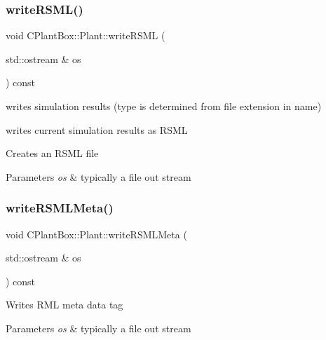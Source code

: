 \subsubsection{\texorpdfstring{write\+R\+S\+M\+L()}{writeRSML()}}
{\footnotesize\ttfamily void C\+Plant\+Box\+::\+Plant\+::write\+R\+S\+ML (\begin{DoxyParamCaption}\item[{std\+::ostream \&}]{os }\end{DoxyParamCaption}) const}



writes simulation results (type is determined from file extension in name) 

writes current simulation results as R\+S\+ML

Creates an R\+S\+ML file


\begin{DoxyParams}{Parameters}
{\em os} & typically a file out stream \\
\hline
\end{DoxyParams}
\mbox{\label{classCPlantBox_1_1Plant_a3ccfdf7f0fb24b6b8bf21e39e6fbfbfc}} 
\subsubsection{\texorpdfstring{write\+R\+S\+M\+L\+Meta()}{writeRSMLMeta()}}
{\footnotesize\ttfamily void C\+Plant\+Box\+::\+Plant\+::write\+R\+S\+M\+L\+Meta (\begin{DoxyParamCaption}\item[{std\+::ostream \&}]{os }\end{DoxyParamCaption}) const\hspace{0.3cm}{\ttfamily [protected]}}

Writes R\+ML meta data tag


\begin{DoxyParams}{Parameters}
{\em os} & typically a file out stream \\
\hline
\end{DoxyParams}
\mbox{\label{classCPlantBox_1_1Plant_af5fcce1b9ed33b10e79dbd6e0811ff9e}} 
